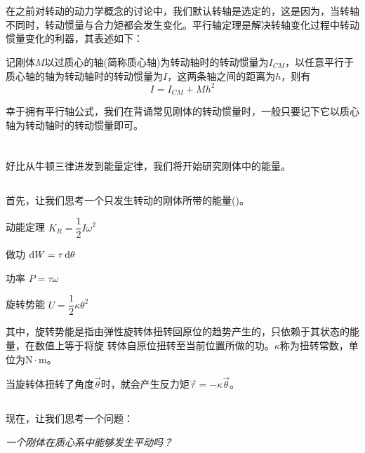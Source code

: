 \section[平行轴定理/施泰纳定理]{}
在之前对转动的动力学概念的讨论中，我们默认转轴是选定的，这是因为，当转轴不同时，转动惯量与合力矩都会发生变化。平行轴定理是解决转轴变化过程中转动惯量变化的利器，其表述如下：

\begin{law}
    记刚体$M$以过质心的轴(简称质心轴)为转动轴时的转动惯量为$I_{CM}$，以任意平行于质心轴的轴为转动轴时的转动惯量为$I$，这两条轴之间的距离为$h$，则有
    \[I=I_{CM}+Mh^2\]
\end{law}

幸于拥有平行轴公式，我们在背诵常见刚体的转动惯量时，一般只要记下它以质心轴为转动轴时的转动惯量即可。

\section[刚体中的能量]{}
好比从牛顿三律进发到能量定律，我们将开始研究刚体中的能量。
\subsection[纯转动中的能量]{}
首先，让我们思考一个只发生转动的刚体所带的能量()。
\begin{Itemize}
    \item 动能定理 $K_R=\dfrac{1}{2}I\omega^2$
    \item 做功 $\dif W=\tau\dif\theta$
    \item 功率 $P=\tau\omega$
    \item 旋转势能 $U=\dfrac{1}{2}\kappa\theta^2$
\end{Itemize}
其中，旋转势能是指由弹性旋转体扭转回原位的趋势产生的，只依赖于其状态的能量，在数值上等于将旋
转体自原位扭转至当前位置所做的功。$\kappa$称为扭转常数，单位为$\mathrm{N}\cdot\mathrm{m}$。

当旋转体扭转了角度$\vec{\theta}$时，就会产生反力矩$\vec{\tau}=-\kappa\vec{\theta}$。
\subsection[同时发生转动与平动时的能量]{}
现在，让我们思考一个问题：
\begin{center}
    \itshape 一个刚体在质心系中能够发生平动吗？
\end{center}

